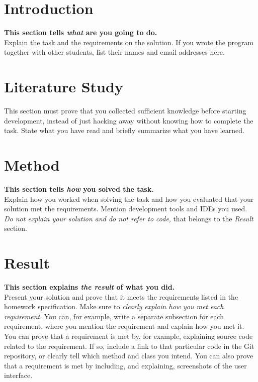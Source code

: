 \documentclass[a4paper]{scrartcl}
\begin{document}
\section{Introduction}

\textbf{This section tells \textit{what} are you going to do.} \\

\noindent Explain the task and the requirements on the solution. If you wrote the program together with other students, list their names and email addresses here.

\section{Literature Study}

This section must prove that you collected sufficient knowledge before starting development, instead of just hacking away without knowing how to complete the task. State what you have read and briefly summarize what you have learned.

\section{Method}

\textbf{This section tells \textit{how} you solved the task.} \\

\noindent Explain how you worked when solving the task and how you evaluated that your solution met the requirements. Mention development tools and IDEs you used. \textit{Do not explain your solution and do not refer to code}, that belongs to the \textit{Result} section.

\section{Result}

\textbf{This section explains \textit{the result} of what you did.} \\

\noindent Present your solution and prove that it meets the requirements listed in the homework specification. Make sure to  \textit{clearly explain how you met each requirement}. You can, for example, write a separate subsection for each requirement, where you mention the requirement and explain how you met it. You can prove that a requirement is met by, for example, explaining source code related to the requirement. If so, include a link to that particular code in the Git repository, or clearly tell which method and class you intend. You can also prove that a requirement is met by including, and explaining, screenshots of the user interface.
\end{document}
